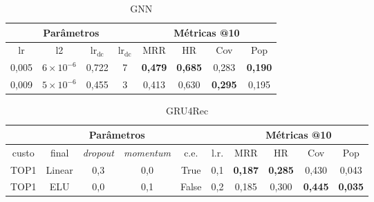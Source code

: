 \begin{table}[htbp]
  \centering
  \begin{tabular}{|c|c|c|c|c|c|c|c|}
    \hline
      \multicolumn{4}{|c|}{Parâmetros} & \multicolumn{4}{c|}{Métricas @10} \\
      \hline
      lr & l2 & $\text{lr}_\text{dc}$ & $\text{lr}_\text{dc}$ & MRR & HR & Cov & Pop \\
      \hline
      0,005 & $6 \times 10^{-6}$ & 0,722 & 7 & \textbf{0,479} & \textbf{0,685} & 0,283 & \textbf{0,190} \\
      \hline
      0,009 & $5 \times 10^{-6}$ & 0,455 & 3 & 0,413 & 0,630 & \textbf{0,295} & 0,195 \\
      \hline
\end{tabular}
      \caption{GNN}
      \label{opt:GNN_last}
\end{table}

\begin{table}[htbp]
  \centering
  \begin{tabular}{|c|c|c|c|c|c|c|c|c|c|}
    \hline
      \multicolumn{6}{|c|}{Parâmetros} & \multicolumn{4}{c|}{Métricas @10} \\
      \hline
      custo & final & \textit{dropout} & \textit{momentum} & c.e. & l.r. & MRR & HR & Cov & Pop \\
      \hline
      TOP1 & Linear & 0,3 & 0,0 & True & 0,1 & \textbf{0,187} & \textbf{0,285} & 0,430 & 0,043 \\
      \hline
      TOP1 & ELU & 0,0 & 0,1 & False & 0,2 & 0,185 & 0,300 & \textbf{0,445} & \textbf{0,035} \\
      \hline


\end{tabular}
      \caption{GRU4Rec}
      \label{opt:GRU4Rec_last}
\end{table}

